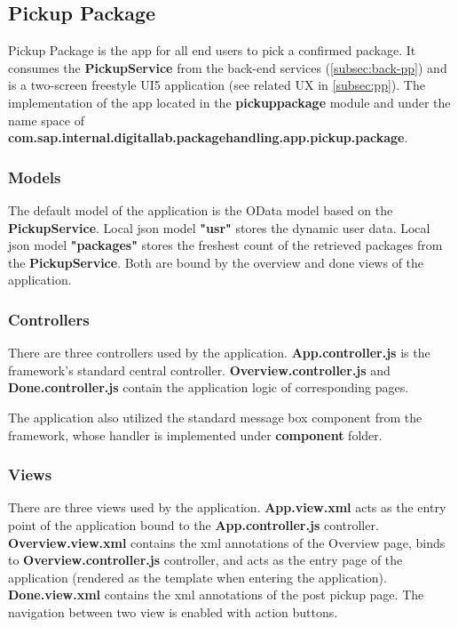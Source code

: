 \subsection{Pickup Package}
\label{subsec:dev-ui-pp}

Pickup Package is the app for all end users to pick a confirmed package. It consumes the \textbf{PickupService} from the back-end services (\autoref{subsec:back-pp}) and is a two-screen freestyle UI5 application (see related UX in \autoref{subsec:pp}). The implementation of the app located in the \textbf{pickuppackage} module and under the name space of \textbf{com.sap.internal.digitallab.packagehandling.app.pickup.package}.

\subsubsection{Models}
The default model of the application is the OData model based on the \textbf{PickupService}. Local json model \textbf{"usr"} stores the dynamic user data. Local json model \textbf{"packages"} stores the freshest count of the retrieved packages from the \textbf{PickupService}. Both are bound by the overview and done views of the application.

\subsubsection{Controllers}
There are three controllers used by the application. \textbf{App.controller.js} is the framework's standard central controller. \textbf{Overview.controller.js} and \textbf{Done.controller.js} contain the application logic of corresponding pages.

The application also utilized the standard message box component from the framework, whose handler is implemented under \textbf{component} folder.

\subsubsection{Views}
There are three views used by the application. \textbf{App.view.xml} acts as the entry point of the application bound to the \textbf{App.controller.js} controller. \textbf{Overview.view.xml} contains the xml annotations of the Overview page, binds to \textbf{Overview.controller.js} controller, and acts as the entry page of the application (rendered as the template when entering the application). \textbf{Done.view.xml} contains the xml annotations of the post pickup page. The navigation between two view is enabled with action buttons.


